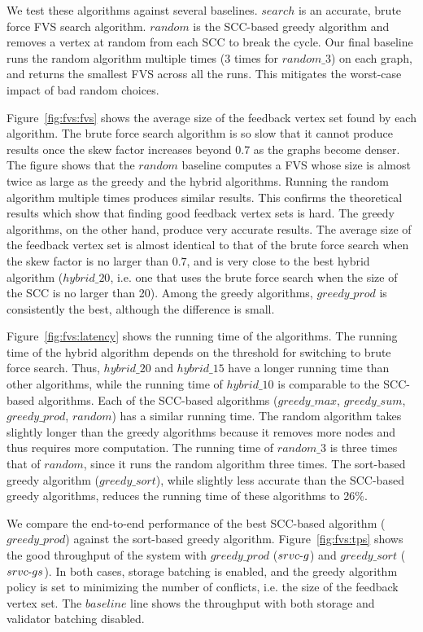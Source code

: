 We test these algorithms against several baselines. $search$ is an accurate, brute force FVS search algorithm. $random$ is the SCC-based greedy algorithm and removes a vertex at random from each SCC to break the cycle. Our final baseline runs the random algorithm multiple times (3 times for $random\_3$) on each graph, and returns the smallest FVS across all the runs. This mitigates the worst-case impact of bad random choices.


Figure~\ref{fig:fvs:fvs} shows the average size of the feedback vertex set found by each algorithm. The brute force search algorithm is so slow that it cannot produce results once the skew factor increases beyond $0.7$ as the graphs become denser.
The figure shows that the $random$ baseline computes a FVS whose size is almost twice as large as the greedy and the hybrid algorithms. Running the random algorithm multiple times produces similar results. This confirms the theoretical results which show that finding good feedback vertex sets is hard. The greedy algorithms, on the other hand, produce very accurate results. The average size of the feedback vertex set is almost identical to that of the brute force search when the skew factor is no larger than $0.7$, and is very close to the best hybrid algorithm ($hybrid\_20$, i.e. one that uses the brute force search when the size of the SCC is no larger than 20). Among the greedy algorithms, $greedy\_prod$ is consistently the best, although the difference is small.

Figure~\ref{fig:fvs:latency} shows the running time of the algorithms. The running time of the hybrid algorithm depends on the threshold for switching to brute force search. Thus, $hybrid\_20$ and $hybrid\_15$ have a longer running time than other algorithms, while the running time of $hybrid\_10$ is comparable to the SCC-based algorithms. Each of the SCC-based algorithms ($greedy\_max$, $greedy\_sum$, $greedy\_prod$, $random$) has a similar running time. The random algorithm takes slightly longer than the greedy algorithms because it removes more nodes and thus requires more computation. The running time of $random\_3$ is three times that of $random$, since it runs the random algorithm three times. The sort-based greedy algorithm ($greedy\_sort$), while slightly less accurate than the SCC-based greedy algorithms, reduces the running time of these algorithms to 26\%. 

We compare the end-to-end performance of the best SCC-based algorithm ($greedy\_prod$) against the sort-based greedy algorithm. Figure~\ref{fig:fvs:tps} shows the good throughput of the system with $greedy\_prod$ ($srvc\hbox{-}g$) and $greedy\_sort$ ($srvc\hbox{-}gs$). In both cases, storage batching is enabled, and the greedy algorithm policy is set to minimizing the number of conflicts, i.e. the size of the feedback vertex set. The $baseline$ line shows the throughput with both storage and validator batching disabled. 

